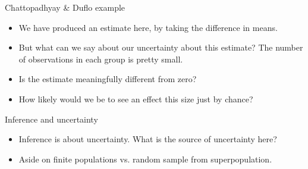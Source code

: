 \documentclass[xcolor={dvipsnames},handout]{beamer}
\begin{document}


\begin{frame}{Chattopadhyay \& Duflo example}

\begin{itemize}
\item We have produced an estimate here, by taking the difference in means.
\item But what can we say about our uncertainty about this estimate? The number of observations in each group is pretty small.
\item Is the estimate meaningfully different from zero?
\item How likely would we be to see an effect this size just by chance?
\end{itemize}

\end{frame}



\begin{frame}{Inference and uncertainty}

\begin{itemize}
\item Inference is about uncertainty.  What is the source of uncertainty here?
\item Aside on finite populations vs. random sample from superpopulation.
\end{itemize}

\end{frame}


\end{document}
